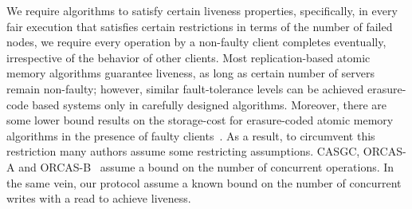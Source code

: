 
%

 We require algorithms to satisfy certain liveness properties, specifically, in every fair execution that satisfies certain restrictions in terms of the number of failed nodes, we require every operation by a non-faulty client 
completes eventually, irrespective of the behavior of other clients.  
Most replication-based atomic memory algorithms guarantee liveness, as long as certain number of servers remain 
non-faulty; however, similar fault-tolerance levels can be achieved erasure-code based systems only in 
carefully designed algorithms. Moreover, there are some lower bound results on the  storage-cost for erasure-coded atomic memory algorithms in the presence of faulty clients~\cite{cadambe2016information, SCCK15}. As a result, to  circumvent this restriction many authors assume some restricting assumptions.  CASGC, ORCAS-A and ORCAS-B~\cite{DGL08} assume a bound on the number of concurrent operations. In the same vein, our protocol assume a known bound on the number of concurrent writes with a read to achieve liveness. 
